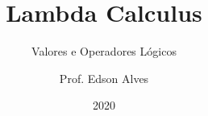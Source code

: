 \title{Lambda Calculus}
\subtitle{Valores e Operadores Lógicos}
\date{2020}
\author{Prof. Edson Alves}
